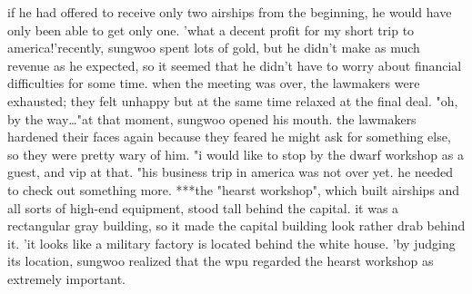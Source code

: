if he had offered to receive only two airships from the beginning, he would have only been able to get only one.
'what a decent profit for my short trip to america!'recently, sungwoo spent lots of gold, but he didn't make as much revenue as he expected, so it seemed that he didn't have to worry about financial difficulties for some time.
when the meeting was over, the lawmakers were exhausted; they felt unhappy but at the same time relaxed at the final deal.
"oh, by the way…"at that moment, sungwoo opened his mouth.
the lawmakers hardened their faces again because they feared he might ask for something else, so they were pretty wary of him.
"i would like to stop by the dwarf workshop as a guest, and vip at that.
"his business trip in america was not over yet.
 he needed to check out something more.
***the "hearst workshop", which built airships and all sorts of high-end equipment, stood tall behind the capital.
 it was a rectangular gray building, so it made the capital building look rather drab behind it.
'it looks like a military factory is located behind the white house.
'by judging its location, sungwoo realized that the wpu regarded the hearst workshop as extremely important.

